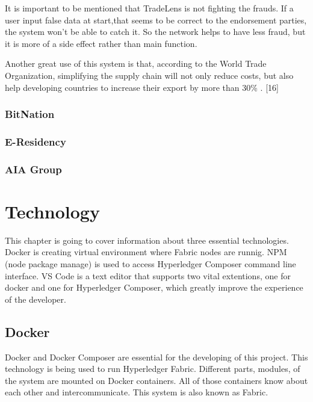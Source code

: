 \documentclass[a4paper,11pt]{report}
\begin{document}
	It is important to be mentioned that TradeLens is not fighting the frauds. If a user input false data at start,that seems to be correct to the endorsement parties, the system won’t be able to catch it. So the network helps to have less fraud, but it is more of a side effect rather than main function.
	
	Another great use of this system is that, according to the World Trade Organization, simplifying the supply chain will not only reduce costs, but also help developing countries to increase their export by more than 30\% . [16]
	
\subsection{BitNation}
\label{bitnation}


\subsection{E-Residency}
\label{eResidency}

\subsection{AIA Group}


\chapter{Technology}            
\label{technical}

This chapter is going to cover information about three essential technologies. Docker is creating virtual environment where Fabric nodes are runnig. NPM (node package manage) is used to access Hyperledger Composer command line interface. VS Code is a text editor that supports two vital extentions, one for docker and one for Hyperledger Composer, which greatly improve the experience of the developer. 

\section{Docker}
\label{docker}
Docker and Docker Composer are essential for the developing of this project. This technology is being used to run Hyperledger Fabric. Different parts, modules, of the system are mounted on Docker containers. All of those containers know about each other and intercommunicate. This system is also known as Fabric.
\end{document}
